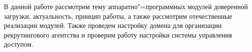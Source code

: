 В данной работе рассмотрим тему аппаратно"=программных модулей доверенной 
загрузки, актуальность, принцип работы, а также рассмотрим отечественные 
реализации модулей. Также проведем настройку домена для организации рекрутингового
агентства и проверим работу настройки системы управления доступом.